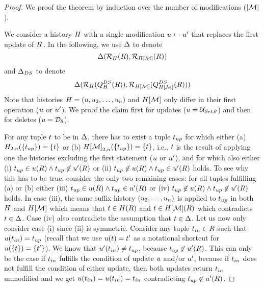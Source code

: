 \begin{proof}
  We proof the theorem by induction over the number of modifications ($\left|{\mathcal{M}}\right|$).

  We consider a history $H$ with a single modification $u \gets u'$ that replaces the first update of $H$.
  In the following, we use $\Delta$ to denote
  \[
    \Delta(\mathcal{R}_{H}(R),\mathcal{R}_{H[\mathcal{M}]}(R))
  \]
  and $\Delta_{DS}$ to denote
  \[
    \Delta(\mathcal{R}_{H}(Q_{H}^{DS}(R)),\mathcal{R}_{H[\mathcal{M}]}(Q_{H[\mathcal{M}]}^{DS}(R)))
    \]
    Note that histories $H = (u, u_2, \ldots, u_n)$ and $H[\mathcal{M}]$ only differ in their first operation ($u$ or $u'$). We proof the claim first for updates ($\up = \aupdate$) and then for deletes ($u = \mathcal{D}_{\theta}$).

\proofpar{$\up = \aupdate$:}
%
For any tuple $t$ to be in $\Delta$, there has to exist a tuple $t_{up}$ for which either (a)  $H_{2,n}(\{t_{up}\}) = \{t\}$ or (b) ${H[\mathcal{M}]}_{2,n}(\{t_{up}\}) = \{t\}$, i.e., $t$ is the result of applying one the histories excluding the first statement ($u$ or $u'$), and for which also either (i) $t_{up} \in u(R) \land t_{up} \not\in u'(R)$ or (ii) $t_{up} \not\in u(R) \land t_{up} \in u'(R)$ holds. To see why this has to be true, consider the only two remaining cases: for all tuples fulfilling (a) or (b) either (iii) $t_{up} \in u(R) \land t_{up} \in u'(R)$ or (iv) $t_{up} \not\in u(R) \land t_{up} \not\in u'(R)$ holds. In case (iii), the same suffix history $(u_2, \ldots, u_n)$ is applied to $t_{up}$ in both $H$ and $H[\mathcal{M}]$ which means that $t \in H(R)$ and $t \in H[\mathcal{M}](R)$ which contradicts $t \in \Delta$. Case (iv) also contradicts the assumption that  $t \in \Delta$.
  Let us now only consider case (i) since (ii) is symmetric. Consider any tuple $t_{in} \in R$ such that $u(t_{in}) = t_{up}$ (recall that we use $u(t) = t'$ as a notational shortcut for $u(\{t\}) = \{t'\}$). We know that $u'(t_{in}) \neq t_{up}$, because $t_{up} \not\in u'(R)$. This can only be the case if $t_{in}$ fulfills the condition of update $u$ and/or $u'$, because if $t_{in}$ does not fulfill the condition of either update, then both updates return $t_{in}$ unmodified and we get $u(t_{in}) = u(t_{in}) = t_{in}$ contradicting $t_{up} \not\in u'(R)$.


\end{proof}
